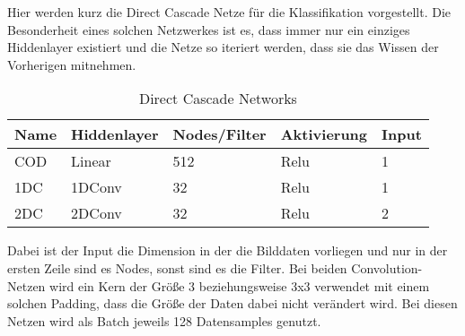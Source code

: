 Hier werden kurz die Direct Cascade Netze für die Klassifikation vorgestellt. Die Besonderheit eines solchen Netzwerkes ist es, dass 
immer nur ein einziges Hiddenlayer existiert und die Netze so iteriert werden, dass sie das Wissen der Vorherigen mitnehmen. 

\begin{table}[h!]
    \centering    
    \begin{tabular}{l|l|l|l|l}
        \textbf{Name} & \textbf{Hiddenlayer} & \textbf{Nodes/Filter} & \textbf{Aktivierung} & \textbf{Input} \\
        \hline
        COD & Linear & 512 & Relu & 1 \\
        1DC & 1DConv & 32 & Relu & 1 \\
        2DC & 2DConv & 32 & Relu & 2
    \end{tabular}
    \caption{Direct Cascade Networks}
        \label{tab:classvor}
\end{table}

Dabei ist der Input die Dimension in der die Bilddaten vorliegen und nur in der ersten Zeile sind es Nodes, sonst sind es die Filter. 
Bei beiden Convolution-Netzen wird ein Kern der Größe 3 beziehungsweise 3x3 verwendet mit einem solchen Padding, dass die Größe der Daten 
dabei nicht verändert wird. Bei diesen Netzen wird als Batch jeweils 128 Datensamples genutzt. 

\iffalse
Das ClassOneDense-Netzwerk besitzt ein Linearlayer mit 512 Nodes als Hiddenlayer 
und der Aktivierungsfunktion Relu. Es nimmt als Input eindimensionale Bilddaten. 

Das 1DConv-Netzwerk besitzt ein 1DConv-Layer als Hiddenlayer mit 32 Filtern, einer Kerngröße von 3 und solchem Padding, dass sich die Größe 
der Daten nicht verändert. Zudem wird die Aktivierungsfunktion Relu genutzt und eindimensionale Bilddaten. 

Das 2DConv-Netzwerk besitzt ein 2DConv-Layer als Hiddenlayer mit 32 Filtern, einer Kerngröße von 3x3 und einem Padding, sodass die Datengröße 
nicht verändert wird. Es wird als Aktivierungsfunktion Relu genutzt und als Input zweidimensionale Bilddaten. 
\fi
